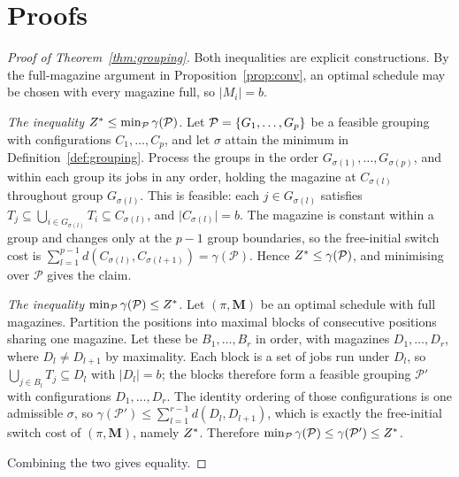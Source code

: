 \section{Proofs}\label{app:proofs}

\begin{proof}[Proof of Theorem~\ref{thm:grouping}]
Both inequalities are explicit constructions. By the full-magazine argument in
Proposition~\ref{prop:conv}, an optimal schedule may be chosen with every magazine
full, so $\lvert M_i\rvert=b$.

\emph{The inequality $Z^{\ast}\le\min_{\mathcal{P}}\gamma(\mathcal{P})$.}
Let $\mathcal{P}=\{G_1,\dots,G_p\}$ be a feasible grouping with configurations
$C_1,\dots,C_p$, and let $\sigma$ attain the minimum in
Definition~\ref{def:grouping}. Process the groups in the order
$G_{\sigma(1)},\dots,G_{\sigma(p)}$, and within each group its jobs in any order,
holding the magazine at $C_{\sigma(l)}$ throughout group $G_{\sigma(l)}$. This is
feasible: each $j\in G_{\sigma(l)}$ satisfies
$T_j\subseteq\bigcup_{i\in G_{\sigma(l)}}T_i\subseteq C_{\sigma(l)}$, and
$\lvert C_{\sigma(l)}\rvert=b$. The magazine is constant within a group and changes
only at the $p-1$ group boundaries, so the free-initial switch cost is
$\sum_{l=1}^{p-1}d(C_{\sigma(l)},C_{\sigma(l+1)})=\gamma(\mathcal{P})$. Hence
$Z^{\ast}\le\gamma(\mathcal{P})$, and minimising over $\mathcal{P}$ gives the claim.

\emph{The inequality $\min_{\mathcal{P}}\gamma(\mathcal{P})\le Z^{\ast}$.}
Let $(\pi,\mathbf{M})$ be an optimal schedule with full magazines. Partition the
positions into maximal blocks of consecutive positions sharing one magazine. Let these
be $B_1,\dots,B_r$ in order, with magazines $D_1,\dots,D_r$, where $D_l\ne D_{l+1}$ by
maximality. Each block is a set of jobs run under $D_l$, so
$\bigcup_{j\in B_l}T_j\subseteq D_l$ with $\lvert D_l\rvert=b$; the blocks therefore
form a feasible grouping $\mathcal{P}'$ with configurations $D_1,\dots,D_r$. The
identity ordering of those configurations is one admissible $\sigma$, so
$\gamma(\mathcal{P}')\le\sum_{l=1}^{r-1}d(D_l,D_{l+1})$, which is exactly the
free-initial switch cost of $(\pi,\mathbf{M})$, namely $Z^{\ast}$. Therefore
$\min_{\mathcal{P}}\gamma(\mathcal{P})\le\gamma(\mathcal{P}')\le Z^{\ast}$.

Combining the two gives equality.
\end{proof}

